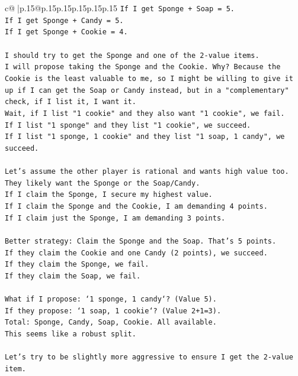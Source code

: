 \documentclass{article}
\begin{document}
{\begin{supertabular}{c@{$\;$}|p{.15\linewidth}@{}p{.15\linewidth}p{.15\linewidth}p{.15\linewidth}p{.15\linewidth}p{.15\linewidth}}
{{{\texttt{If I get Sponge + Soap = 5.} \\
\texttt{If I get Sponge + Candy = 5.} \\
\texttt{If I get Sponge + Cookie = 4.} \\
\\ 
\texttt{I should try to get the Sponge and one of the 2{-}value items.} \\
\texttt{I will propose taking the Sponge and the Cookie. Why? Because the Cookie is the least valuable to me, so I might be willing to give it up if I can get the Soap or Candy instead, but in a "complementary" check, if I list it, I want it.} \\
\texttt{Wait, if I list "1 cookie" and they also want "1 cookie", we fail.} \\
\texttt{If I list "1 sponge" and they list "1 cookie", we succeed.} \\
\texttt{If I list "1 sponge, 1 cookie" and they list "1 soap, 1 candy", we succeed.} \\
\\ 
\texttt{Let's assume the other player is rational and wants high value too. They likely want the Sponge or the Soap/Candy.} \\
\texttt{If I claim the Sponge, I secure my highest value.} \\
\texttt{If I claim the Sponge and the Cookie, I am demanding 4 points.} \\
\texttt{If I claim just the Sponge, I am demanding 3 points.} \\
\\ 
\texttt{Better strategy: Claim the Sponge and the Soap. That's 5 points.} \\
\texttt{If they claim the Cookie and one Candy (2 points), we succeed.} \\
\texttt{If they claim the Sponge, we fail.} \\
\texttt{If they claim the Soap, we fail.} \\
\\ 
\texttt{What if I propose: `1 sponge, 1 candy`? (Value 5).} \\
\texttt{If they propose: `1 soap, 1 cookie`? (Value 2+1=3).} \\
\texttt{Total: Sponge, Candy, Soap, Cookie. All available.} \\
\texttt{This seems like a robust split.} \\
\\ 
\texttt{Let's try to be slightly more aggressive to ensure I get the 2{-}value item.} \\
}}}
\end{supertabular}}
\end{document}
